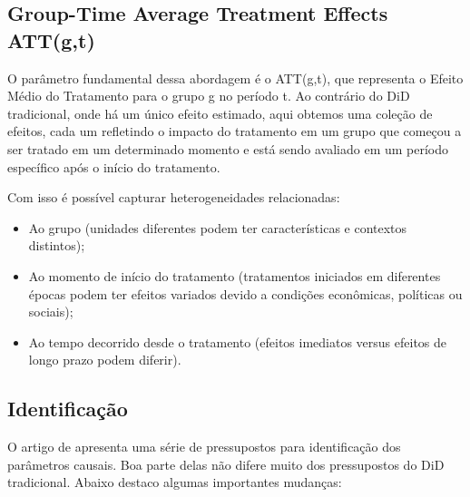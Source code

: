 \documentclass[
	12pt,				%
	oneside,			%
	a4paper,			%
	english,			%
	french,				%
	spanish,			%
	brazil				%
	]{abntex2}
\begin{document}
\subsection{Group-Time Average Treatment Effects ATT(g,t)}

O parâmetro fundamental dessa abordagem é o ATT(g,t), que representa o Efeito Médio do Tratamento para o grupo g no período t. Ao contrário do DiD tradicional, onde há um único efeito estimado, aqui obtemos uma coleção de efeitos, cada um refletindo o impacto do tratamento em um grupo que começou a ser tratado em um determinado momento e está sendo avaliado em um período específico após o início do tratamento.

Com isso é possível capturar heterogeneidades relacionadas:
\begin{itemize}
\item Ao grupo (unidades diferentes podem ter características e contextos distintos);
\item Ao momento de início do tratamento (tratamentos iniciados em diferentes épocas podem ter efeitos variados devido a condições econômicas, políticas ou sociais);
\item Ao tempo decorrido desde o tratamento (efeitos imediatos versus efeitos de longo prazo podem diferir).
\end{itemize}

\subsection{Identificação}

O artigo de  apresenta uma série de pressupostos para identificação dos parâmetros causais. Boa parte delas não difere muito dos pressupostos do DiD tradicional. Abaixo destaco algumas importantes mudanças:
\end{document}
